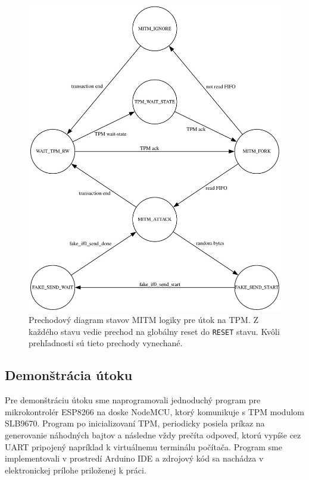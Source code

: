 \begin{figure}
    \centerline{\includegraphics[width=1\textwidth]{images/misc/tpmMitmStateTransition.pdf}}
    \caption[Prechodový diagram stavov MITM logiky pre útok na TPM]{Prechodový diagram stavov MITM logiky pre útok na TPM. Z každého stavu vedie prechod na globálny reset do \texttt{RESET} stavu. Kvôli prehľadnosti sú tieto prechody vynechané.}
    \label{obr:tpmMitmStateTransition}
\end{figure}

\subsection{Demonštrácia útoku}
Pre demonštráciu útoku sme naprogramovali jednoduchý program pre mikrokontrolér ESP8266 na doske NodeMCU, ktorý komunikuje s TPM modulom SLB9670. Program po inicializovaní TPM, periodicky posiela príkaz na generovanie náhodných bajtov a následne vždy prečíta odpoveď, ktorú vypíše cez UART pripojený napríklad k virtuálnemu terminálu počítača. Program sme implementovali v prostredí Arduino IDE a zdrojový kód sa nachádza v elektronickej prílohe priloženej k práci.


